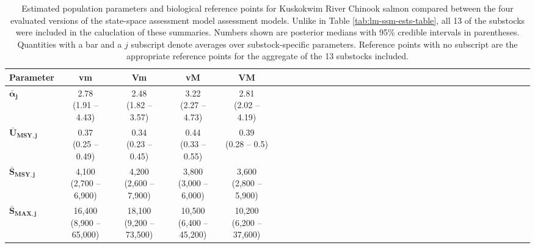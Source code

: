 \documentclass[12pt,]{book}
\theoremstyle{definition}
\theoremstyle{definition}
\theoremstyle{definition}
\theoremstyle{remark}
\begin{document}
\clearpage

\begin{table}[H]

\caption{\label{tab:ssm-ests-table}Estimated population parameters and biological reference points for Kuskokwim River Chinook salmon compared between the four evaluated versions of the state-space assessment model assessment models. Unlike in Table \ref{tab:lm-ssm-ests-table}, all 13 of the substocks were included in the caluclation of these summaries. Numbers shown are posterior medians with 95\% credible intervals in parentheses. Quantities with a bar and a $j$ subscript denote averages over substock-specific parameters. Reference points with no subscript are the appropriate reference points for the aggregate of the 13 substocks included.}
\centering
\begin{tabular}[t]{lcccccclcccccclcccccclcccccclcccccc}
\toprule
\textbf{Parameter} & \textbf{vm} & \textbf{Vm} & \textbf{vM} & \textbf{VM}\\
\midrule
$\boldsymbol{\bar{\alpha}_j}$ & \makecell[c]{2.78\\(1.91 -- 4.43)} & \makecell[c]{2.48\\(1.82 -- 3.57)} & \makecell[c]{3.22\\(2.27 -- 4.73)} & \makecell[c]{2.81\\(2.02 -- 4.19)}\\
$\boldsymbol{\bar{U}_{\text{MSY},j}}$ & \makecell[c]{0.37\\(0.25 -- 0.49)} & \makecell[c]{0.34\\(0.23 -- 0.45)} & \makecell[c]{0.44\\(0.33 -- 0.55)} & \makecell[c]{0.39\\(0.28 -- 0.5)}\\
$\boldsymbol{\bar{S}_{\text{MSY},j}}$ & \makecell[c]{4,100\\(2,700 -- 6,900)} & \makecell[c]{4,200\\(2,600 -- 7,900)} & \makecell[c]{3,800\\(3,000 -- 6,000)} & \makecell[c]{3,600\\(2,800 -- 5,900)}\\
$\boldsymbol{\bar{S}_{\text{MAX},j}}$ & \makecell[c]{16,400\\(8,900 -- 65,000)} & \makecell[c]{18,100\\(9,200 -- 73,500)} & \makecell[c]{10,500\\(6,400 -- 45,200)} & \makecell[c]{10,200\\(6,200 -- 37,600)}\\

\end{tabular}
\end{table}
\end{document}
